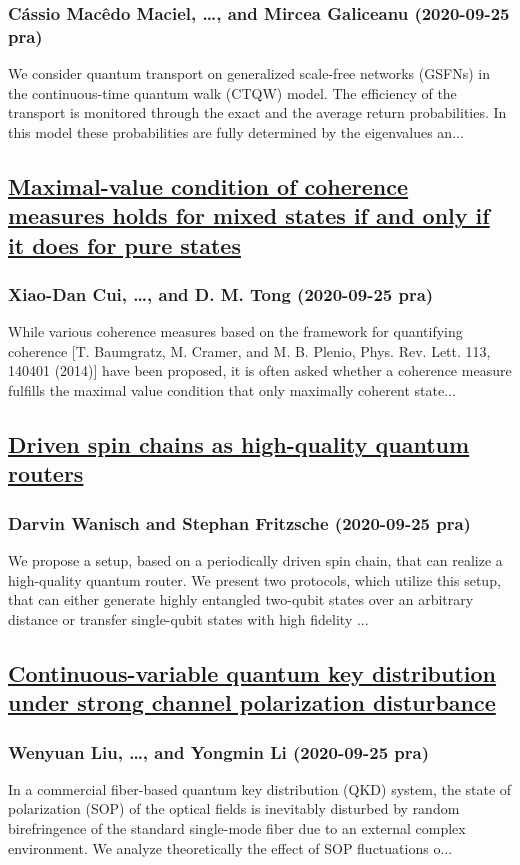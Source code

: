 \subsubsection*{Cássio Macêdo Maciel, \dots, and Mircea Galiceanu (2020-09-25 pra)}
We consider quantum transport on generalized scale-free networks (GSFNs) in the continuous-time quantum walk (CTQW) model. The efficiency of the transport is monitored through the exact and the average return probabilities. In this model these probabilities are fully determined by the eigenvalues an...
\subsection*{\href{http://link.aps.org/doi/10.1103/PhysRevA.102.032419}{Maximal-value condition of coherence measures holds for mixed states if and only if it does for pure states}}
\subsubsection*{Xiao-Dan Cui, \dots, and D. M. Tong (2020-09-25 pra)}
While various coherence measures based on the framework for quantifying coherence [T. Baumgratz, M. Cramer, and M. B. Plenio, Phys. Rev. Lett. 113, 140401 (2014)] have been proposed, it is often asked whether a coherence measure fulfills the maximal value condition that only maximally coherent state...
\subsection*{\href{http://link.aps.org/doi/10.1103/PhysRevA.102.032624}{Driven spin chains as high-quality quantum routers}}
\subsubsection*{Darvin Wanisch and Stephan Fritzsche (2020-09-25 pra)}
We propose a setup, based on a periodically driven spin chain, that can realize a high-quality quantum router. We present two protocols, which utilize this setup, that can either generate highly entangled two-qubit states over an arbitrary distance or transfer single-qubit states with high fidelity ...
\subsection*{\href{http://link.aps.org/doi/10.1103/PhysRevA.102.032625}{Continuous-variable quantum key distribution under strong channel polarization disturbance}}
\subsubsection*{Wenyuan Liu, \dots, and Yongmin Li (2020-09-25 pra)}
In a commercial fiber-based quantum key distribution (QKD) system, the state of polarization (SOP) of the optical fields is inevitably disturbed by random birefringence of the standard single-mode fiber due to an external complex environment. We analyze theoretically the effect of SOP fluctuations o...
